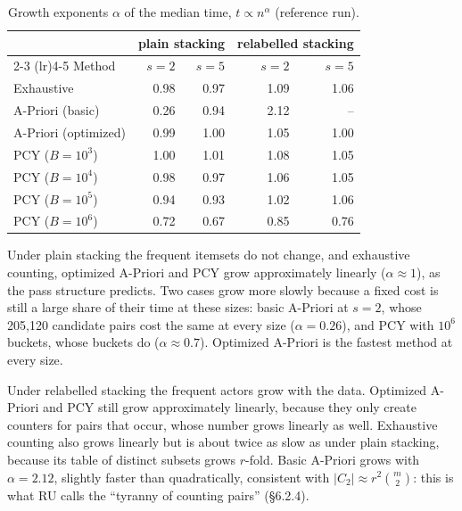 \begin{table}[ht]
  \centering
  \caption{Growth exponents $\alpha$ of the median time, $t \propto n^{\alpha}$ (reference run).}
  \label{tab:exponents}
  \begin{tabular}{lrrrr}
    \toprule
    & \multicolumn{2}{c}{plain stacking} & \multicolumn{2}{c}{relabelled stacking} \\
    \cmidrule(lr){2-3} \cmidrule(lr){4-5}
    Method & $s = 2$ & $s = 5$ & $s = 2$ & $s = 5$ \\
    \midrule
    Exhaustive & 0.98 & 0.97 & 1.09 & 1.06 \\
    A-Priori (basic) & 0.26 & 0.94 & 2.12 & -- \\
    A-Priori (optimized) & 0.99 & 1.00 & 1.05 & 1.00 \\
    PCY ($B = 10^3$) & 1.00 & 1.01 & 1.08 & 1.05 \\
    PCY ($B = 10^4$) & 0.98 & 0.97 & 1.06 & 1.05 \\
    PCY ($B = 10^5$) & 0.94 & 0.93 & 1.02 & 1.06 \\
    PCY ($B = 10^6$) & 0.72 & 0.67 & 0.85 & 0.76 \\
    \bottomrule
  \end{tabular}
\end{table}

Under plain stacking the frequent itemsets do not change, and exhaustive counting, optimized A-Priori and PCY grow approximately linearly ($\alpha \approx 1$), as the pass structure predicts. Two cases grow more slowly because a fixed cost is still a large share of their time at these sizes: basic A-Priori at $s = 2$, whose 205{,}120 candidate pairs cost the same at every size ($\alpha = 0.26$), and PCY with $10^6$ buckets, whose buckets do ($\alpha \approx 0.7$). Optimized A-Priori is the fastest method at every size.

Under relabelled stacking the frequent actors grow with the data. Optimized A-Priori and PCY still grow approximately linearly, because they only create counters for pairs that occur, whose number grows linearly as well. Exhaustive counting also grows linearly but is about twice as slow as under plain stacking, because its table of distinct subsets grows $r$-fold. Basic A-Priori grows with $\alpha = 2.12$, slightly faster than quadratically, consistent with $|C_2| \approx r^2 \binom{m}{2}$: this is what RU calls the ``tyranny of counting pairs'' (\S6.2.4).

